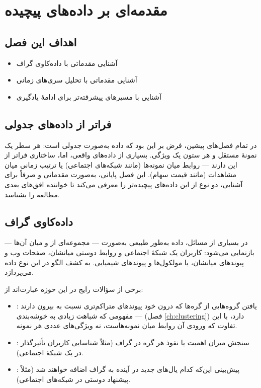 \chapter{مقدمه‌ای بر داده‌های پیچیده}
\label{ch:complex-data}

\section*{اهداف این فصل}
\begin{itemize}
    \item آشنایی مقدماتی با داده‌کاوی گراف
    \item آشنایی مقدماتی با تحلیل سری‌های زمانی
    \item آشنایی با مسیرهای پیشرفته‌تر برای ادامهٔ یادگیری
\end{itemize}

\section{فراتر از داده‌های جدولی}

در تمام فصل‌های پیشین، فرض بر این بود که داده به‌صورت جدولی است: هر
سطر یک نمونهٔ مستقل و هر ستون یک ویژگی. بسیاری از داده‌های واقعی، اما،
ساختاری فراتر از این دارند — روابط میان نمونه‌ها (مانند شبکه‌های
اجتماعی) یا ترتیب زمانی میان مشاهدات (مانند قیمت سهام). این فصل پایانی،
به‌صورت مقدماتی و صرفاً برای آشنایی، دو نوع از این داده‌های پیچیده‌تر
را معرفی می‌کند تا خواننده افق‌های بعدی مطالعه را بشناسد.

\section{داده‌کاوی گراف}

در بسیاری از مسائل، داده به‌طور طبیعی به‌صورت
 — مجموعه‌ای از
 و
 میان آن‌ها — بازنمایی می‌شود: کاربران یک شبکهٔ
اجتماعی و روابط دوستی میانشان، صفحات وب و پیوندهای میانشان، یا مولکول‌ها
و پیوندهای شیمیایی.  به
کشف الگو در این نوع داده می‌پردازد.

برخی از سؤالات رایج در این حوزه عبارت‌اند از:

\begin{itemize}
    \item {}: یافتن گروه‌هایی از گره‌ها
          که درون خود پیوندهای متراکم‌تری نسبت به بیرون دارند — مفهومی
          که شباهت زیادی به خوشه‌بندی (فصل \ref{ch:clustering}) دارد،
          با این تفاوت که ورودی آن روابط میان نمونه‌هاست، نه ویژگی‌های
          عددی هر نمونه.
    \item {}: سنجش میزان اهمیت یا نفوذ هر گره در
          گراف (مثلاً شناسایی کاربران تأثیرگذار در یک شبکهٔ اجتماعی).
    \item {}: پیش‌بینی این‌که کدام یال‌های
          جدید در آینده به گراف اضافه خواهند شد (مثلاً پیشنهاد دوستی در
          شبکه‌های اجتماعی).
\end{itemize}

